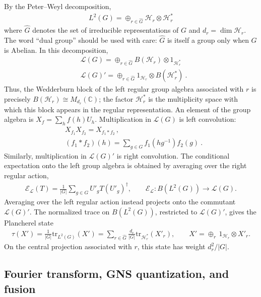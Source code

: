 \documentclass[11pt]{article}
\newcommand{\Tr}{\mathrm{tr}}
\newcommand{\mE}{\mathcal{E}}
\newcommand{\mH}{\mathcal{H}}
\newcommand{\nn}{\nonumber}
\begin{document}
By the Peter--Weyl decomposition,
\begin{align}
    L^2(G)=\oplus_{r\in\hat{G}} \mH_r\otimes \mH_r^*
\end{align}
where $\hat G$ denotes the set of irreducible representations of $G$ and
$d_r=\dim\mH_r$. The word ``dual group'' should be used with care:
$\hat G$ is itself a group only when $G$ is Abelian. In this decomposition,
\begin{align}
    &\mathcal{L}(G)=\oplus_{r\in\hat G} B(\mH_r)\otimes 1_{\mH_r^*}\nn\\
    &\mathcal{L}(G)'=\oplus_{r\in\hat G} 1_{\mH_r}\otimes B(\mH_r^*)\ .
\end{align}
Thus, the Wedderburn block of the left regular group algebra associated with
$r$ is precisely $B(\mH_r)\cong M_{d_r}(\mathbb C)$; the factor $\mH_r^*$ is
the multiplicity space with which this block appears in the regular
representation.
An element of the group algebra is $X_f=\sum_h f(h)U_h$. Multiplication in
$\mathcal L(G)$ is left convolution:
\begin{align}
    &X_{f_1}X_{f_2}=X_{f_1*f_2}\,,\nn\\
    &(f_1*f_2)(h)=\sum_{g\in G} f_1(h g^{-1})f_2(g)\ .
\end{align}
Similarly, multiplication in $\mathcal{L}(G)'$ is right convolution. The
conditional expectation onto the left group algebra is obtained by averaging over
the right regular action,
\begin{align}
    \mE_{\mathcal L}(T)=\frac{1}{|G|}\sum_{g\in G}U'_g T (U'_g)^\dagger,
    \qquad
    \mE_{\mathcal L}:B(L^2(G))\to\mathcal L(G).
\end{align}
Averaging over the left regular action instead projects onto the commutant
$\mathcal L(G)'$. The normalized trace on $B(L^2(G))$, restricted to
$\mathcal L(G)'$, gives the Plancherel state
\begin{align}
    \tau(X')=\frac{1}{|G|}\Tr_{L^2(G)}(X')
    =\sum_{r\in\hat G}\frac{d_r}{|G|}
      \Tr_{\mH_r^*}(X'_r),
    \qquad
    X'=\oplus_r\,1_{\mH_r}\otimes X'_r .
\end{align}
On the central projection associated with $r$, this state has weight
$d_r^2/|G|$.



\subsection{Fourier transform, GNS quantization, and fusion}
\end{document}
